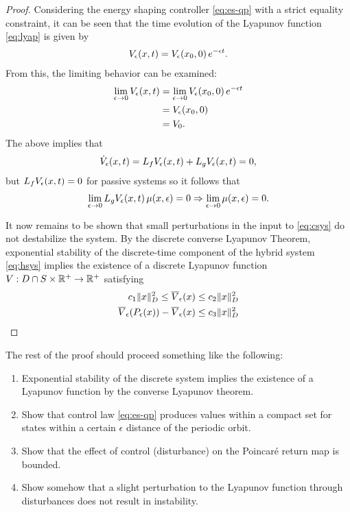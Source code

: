 \documentclass[twocolumn]{article}
\begin{document}
\begin{proof}
  Considering the energy shaping controller \eqref{eq:es-qp} with a strict equality constraint, it can be seen that the time evolution of the Lyapunov function \eqref{eq:lyap} is given by
  \begin{align*}
    V_{\epsilon}(x, t) = V_{\epsilon}(x_{0}, 0) \, e^{-\epsilon t}.
  \end{align*}
  From this, the limiting behavior can be examined:
  \begin{align*}
    \lim_{\epsilon \to 0} V_{\epsilon}(x, t) &= \lim_{\epsilon \to 0} V_{\epsilon}(x_{0}, 0) \, e^{-\epsilon t}\\
    &= V_{\epsilon}(x_{0}, 0)\\
    &= V_0.
  \end{align*}
  The above implies that
  \begin{align*}
    {\dot V}_{\epsilon}(x, t) = L_{f} V_{\epsilon}(x, t) + L_{g} V_{\epsilon}(x, t) = 0,
  \end{align*}
  but $L_{f} V_{\epsilon}(x, t) = 0$ for passive systems so it follows that
  \begin{align*}
    \lim_{\epsilon \to 0} L_{g} V_{\epsilon}(x, t) \, \mu(x, \epsilon) = 0 \Rightarrow \lim_{\epsilon \to 0} \mu(x, \epsilon) = 0.
  \end{align*}

  It now remains to be shown that small perturbations in the input to \eqref{eq:csys} do not destabilize the system.
  By the discrete converse Lyapunov Theorem, exponential stability of the discrete-time component of the hybrid system \eqref{eq:hsys} implies the existence of a discrete Lyapunov function $V : D \cap S \times \mathbb{R}^{+} \to \mathbb{R}^{+}$ satisfying
  \begin{align*}
    c_{1} \| x \|^{2}_{D} \leq \overline{V}_{\epsilon}(x) \leq c_{2} \| x \|_{D}^2\\
    \overline{V}_{\epsilon}(P_{\epsilon}(x)) - \overline{V}_{\epsilon}(x) \leq c_{3} \| x \|^{2}_{D}
  \end{align*}

\end{proof}

The rest of the proof should proceed something like the following:
\begin{enumerate}
\item Exponential stability of the discrete system implies the existence of a Lyapunov function by the converse Lyapunov theorem.
\item Show that control law \eqref{eq:es-qp} produces values within a compact set for states within a certain $\epsilon$ distance of the periodic orbit.
\item Show that the effect of control (disturbance) on the Poincar{\'e} return map is bounded.
\item Show somehow that a slight perturbation to the Lyapunov function through disturbances does not result in instability.
\end{enumerate}
\end{document}
